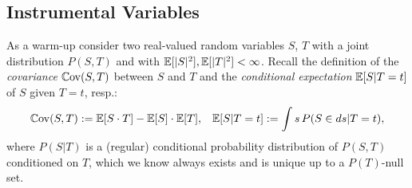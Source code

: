 \subsection{Instrumental Variables}


As a warm-up consider two real-valued random variables $S$, $T$ with a joint distribution $P(S,T)$ and 
with $\mathbb{E}[|S|^2], \mathbb{E}[|T|^2] < \infty$.
Recall the definition of the \emph{covariance} $\mathbb{C}\mathrm{ov}(S,T)$ between $S$ and $T$ and the \emph{conditional expectation} $\mathbb{E}[S|T=t]$ of $S$ given $T=t$, resp.:
\begin{align*}
    \mathbb{C}\mathrm{ov}(S,T) &:= \mathbb{E}[S\cdot T] - \mathbb{E}[S]\cdot \mathbb{E}[T], & \mathbb{E}[S|T=t] := \int s \, P(S \in ds|T=t),
\end{align*}
where $P(S|T)$ is a (regular) conditional probability distribution of $P(S,T)$ conditioned on $T$, which we know always exists and is unique up to a $P(T)$-null set.


